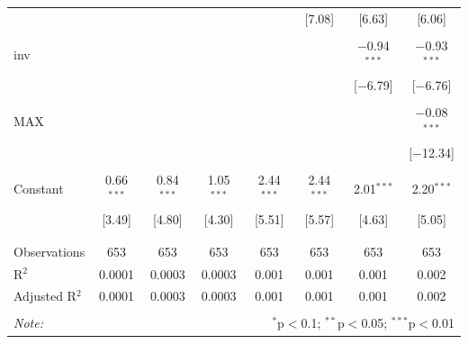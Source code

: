 \documentclass[12pt]{article}
\begin{document}
\begin{table}[!htbp]
\begin{tabular}{@{\extracolsep{0pt}}lccccccc}
  &  &  &  &  & [7.08] & [6.63] & [6.06] \\ 
  & & & & & & & \\ 
 inv &  &  &  &  &  & $-$0.94$^{***}$ & $-$0.93$^{***}$ \\ 
  &  &  &  &  &  & [$-$6.79] & [$-$6.76] \\ 
  & & & & & & & \\ 
 MAX &  &  &  &  &  &  & $-$0.08$^{***}$ \\ 
  &  &  &  &  &  &  & [$-$12.34] \\ 
  & & & & & & & \\ 
 Constant & 0.66$^{***}$ & 0.84$^{***}$ & 1.05$^{***}$ & 2.44$^{***}$ & 2.44$^{***}$ & 2.01$^{***}$ & 2.20$^{***}$ \\ 
  & [3.49] & [4.80] & [4.30] & [5.51] & [5.57] & [4.63] & [5.05] \\ 
  & & & & & & & \\ 
\hline \\[-1.8ex] 
Observations & 653 & 653 & 653 & 653 & 653 & 653 & 653 \\ 
R$^{2}$ & 0.0001 & 0.0003 & 0.0003 & 0.001 & 0.001 & 0.001 & 0.002 \\ 
Adjusted R$^{2}$ & 0.0001 & 0.0003 & 0.0003 & 0.001 & 0.001 & 0.001 & 0.002 \\ 
\hline 
\hline \\[-1.8ex] 
\textit{Note:}  & \multicolumn{7}{r}{$^{*}$p$<$0.1; $^{**}$p$<$0.05; $^{***}$p$<$0.01} \\ 
\end{tabular}
\end{table}

\clearpage
\end{document}
